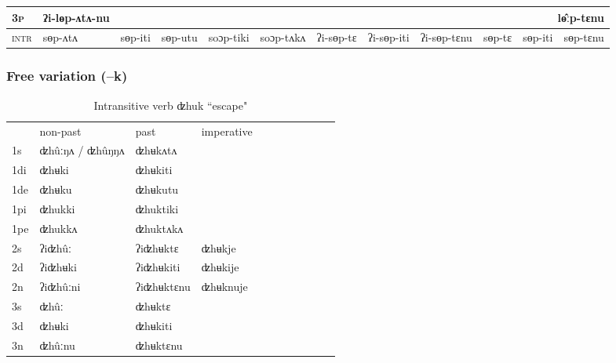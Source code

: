 \documentclass[xcolor=table]{beamer}
\newcommand{\ipa}[1]{{\phon \mbox{#1}}} %
\newcommand{\grise}[1]{\cellcolor{lightgray}\textbf{#1}}
\begin{document}
\begin{frame}
\begin{table}[H]
{\begin{tabular}{l|l|l|l|l|l|l|l|l|l|l|l|}
\cline{2-2}	
\cline{10-11}
\textsc{3p} &	 	\ipa{ʔi-lɵp-ʌtʌ-nu}  	 &	  	 &	   	&	 	  &	 	  &	 	  &		   &	   	&	   \multicolumn{3}{r|}{\ipa{lɵ̂ːp-tɛnu}   } \\	
\hline
\textsc{intr}&\ipa{sɵp-ʌtʌ}   &	\ipa{sɵp-iti}   &	\ipa{sɵp-utu}   &	\ipa{soɔp-tiki}   &	\ipa{soɔp-tʌkʌ}   &		\ipa{ʔi-sɵp-tɛ}   &		\ipa{ʔi-sɵp-iti}   &	\ipa{ʔi-sɵp-tɛnu}   &	  	   \ipa{sɵp-tɛ}   &	\ipa{sɵp-iti}   &	\ipa{sɵp-tɛnu}   	  	   \\	
\hline
\end{tabular}}
\end{table} 
  \end{frame} 
  
  \begin{frame} 
 \frametitle{Free variation (--k)} 
 
   \begin{table}[H]
\label{uk.vi}
\caption{Intransitive verb \ipa{ʣhuk} ``escape"  }
\begin{tabular}{l|l|l|l|l|l|l|l|l|l|l}  \hline
&non-past & past & imperative \\ 
1s &ʣhûːŋʌ / ʣhûŋŋʌ \grise{} &ʣhʉkʌtʌ \\ 
1di &ʣhʉki &ʣhʉkiti   \\
1de &ʣhʉku &ʣhʉkutu   \\ 
1pi &ʣhukki &ʣhuktiki   \\ 
1pe &ʣhukkʌ &ʣhuktʌkʌ   \\ 
2s & ʔiʣhûː & ʔiʣhʉktɛ &ʣhʉkje  \\ 
2d & ʔiʣhʉki & ʔiʣhʉkiti &ʣhʉkije    \\
2n & ʔiʣhûːni  & ʔiʣhʉktɛnu &ʣhʉknuje  \\ 
3s & ʣhûː & ʣhʉktɛ   \\ 
3d & ʣhʉki & ʣhʉkiti   \\ 
3n & ʣhûːnu  & ʣhʉktɛnu \\ 
\hline
\end{tabular}
\end{table}
  \end{frame}   
  
\end{document}
